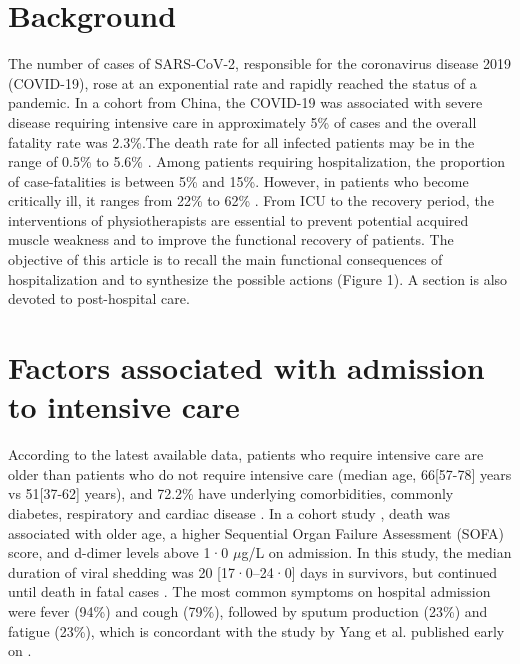 \section{Background}

\lettrine[lines=2]{\color{color2}T}{}he number of cases of SARS-CoV-2, responsible for the coronavirus disease 2019 (COVID-19), rose at an exponential rate and rapidly reached the status of a pandemic. In a cohort from China, the COVID-19 was associated with severe disease requiring intensive care in approximately 5\% of cases and the overall fatality rate was 2.3\%.The death rate for all infected patients may be in the range of 0.5\% to 5.6\% \cite{wu_characteristics_2020,baud_real_2020}. Among patients requiring hospitalization, the proportion of case-fatalities is between 5\% and 15\%. However, in patients who become critically ill, it ranges from 22\% to 62\% \cite{yang_clinical_2020,wang_clinical_2020}.
From ICU to the recovery period, the interventions of physiotherapists are essential to prevent potential acquired muscle weakness and to improve the functional recovery of patients. The objective of this article is to recall the main functional consequences of hospitalization and to synthesize the possible actions (Figure 1). A section is also devoted to post-hospital care.

\section{Factors associated with admission to intensive care} 
According to the latest available data, patients who require intensive care are older than patients who do not require intensive care (median age, 66[57-78] years vs 51[37-62] years), and 72.2\% have underlying comorbidities, commonly diabetes, respiratory and cardiac disease \cite{wu_characteristics_2020,wang_clinical_2020}. In a cohort study \cite{zhou_clinical_2020}, death was associated with older age, a higher Sequential Organ Failure Assessment (SOFA) score,  and d-dimer levels above 1·0 $\mu$g/L on admission. In this study, the median duration of viral shedding was 20 [17·0–24·0] days in survivors, but continued until death in fatal cases \cite{zhou_clinical_2020}. The most common symptoms on hospital admission were fever (94\%) and cough (79\%), followed by sputum production (23\%) and fatigue (23\%), which is concordant with the study by Yang et al. published early on \cite{yang_clinical_2020}. 

